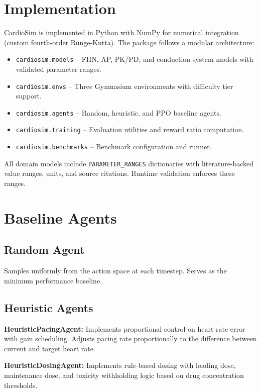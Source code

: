 \documentclass[11pt,a4paper]{article}
\begin{document}
\section{Implementation}

CardioSim is implemented in Python with NumPy for numerical integration (custom fourth-order Runge-Kutta). The package follows a modular architecture:

\begin{itemize}
    \item \texttt{cardiosim.models} -- FHN, AP, PK/PD, and conduction system models with validated parameter ranges.
    \item \texttt{cardiosim.envs} -- Three Gymnasium environments with difficulty tier support.
    \item \texttt{cardiosim.agents} -- Random, heuristic, and PPO baseline agents.
    \item \texttt{cardiosim.training} -- Evaluation utilities and reward ratio computation.
    \item \texttt{cardiosim.benchmarks} -- Benchmark configuration and runner.
\end{itemize}

All domain models include \texttt{PARAMETER\_RANGES} dictionaries with literature-backed value ranges, units, and source citations. Runtime validation enforces these ranges.

\section{Baseline Agents}

\subsection{Random Agent}

Samples uniformly from the action space at each timestep. Serves as the minimum performance baseline.

\subsection{Heuristic Agents}

\textbf{HeuristicPacingAgent:} Implements proportional control on heart rate error with gain scheduling. Adjusts pacing rate proportionally to the difference between current and target heart rate.

\textbf{HeuristicDosingAgent:} Implements rule-based dosing with loading dose, maintenance dose, and toxicity withholding logic based on drug concentration thresholds.
\end{document}
